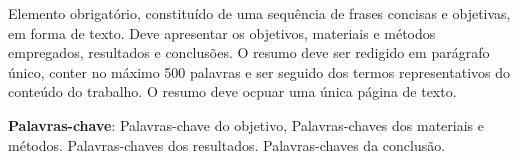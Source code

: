 
\noindent%
Elemento obrigatório, constituído de uma sequência de frases concisas e objetivas, em forma de texto.
Deve apresentar os objetivos, materiais e métodos empregados, resultados e conclusões. O resumo deve ser redigido em parágrafo único, conter no máximo 500 palavras e ser seguido dos termos representativos do conteúdo do trabalho. O resumo deve ocpuar uma única página de texto.
\vfill

\noindent \textbf{Palavras-chave}: Palavras-chave do objetivo, Palavras-chaves dos materiais e métodos. Palavras-chaves dos resultados. Palavras-chaves da conclusão.
